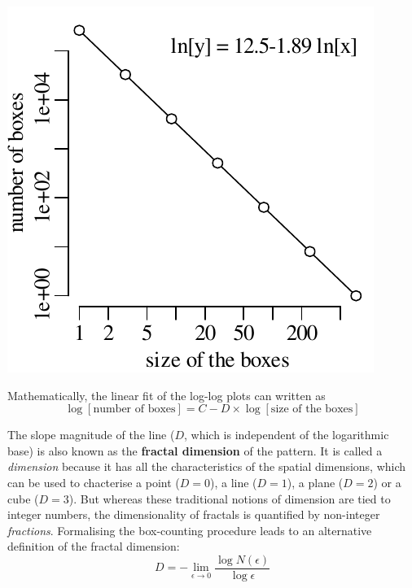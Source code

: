 \noindent\begin{minipage}[t][][b]{.3\textwidth}
  \includegraphics[width=\textwidth]{../figures/sierpinskiboxcounts.pdf}\medskip
\end{minipage}
\begin{minipage}[t][][t]{.7\textwidth}
  \label{fig:sierpinskiboxcounts}
\end{minipage}

Mathematically, the linear fit of the log-log plots can written as
\begin{equation}
  \log[\mbox{number of boxes}] = C - D \times \log[\mbox{size of the boxes}]
  \label{eq:fractaldim}
\end{equation}

The slope magnitude of the line ($D$, which is independent of the
logarithmic base) is also known as the \textbf{fractal dimension} of
the pattern. It is called a \emph{dimension} because it has all the
characteristics of the spatial dimensions, which can be used to
chacterise a point ($D=0$), a line ($D=1$), a plane ($D=2$) or a cube
($D=3$). But whereas these traditional notions of dimension are tied
to integer numbers, the dimensionality of fractals is quantified by
non-integer \emph{fractions}. Formalising the box-counting procedure
leads to an alternative definition of the fractal dimension:
\begin{equation}
  D = -\lim\limits_{\epsilon \to 0}\frac{\log{N(\epsilon)}}{\log{\epsilon}}
  \label{eq:Minkowski}
\end{equation}

